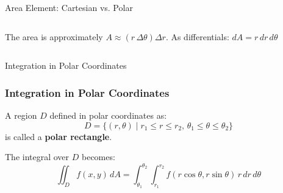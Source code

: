 \documentclass[aspectratio=169, UTF8]{beamer}
\begin{document}
\begin{frame}{Area Element: Cartesian vs. Polar}
\begin{columns}
\begin{column}{0.5\textwidth}
            The area is approximately $A \approx (r \, \Delta\theta) \Delta r$. As differentials:
            $ dA = r \, dr \, d\theta $
        \end{column}
    \end{columns}

\end{frame}

\begin{frame}{Integration in Polar Coordinates}
    \frametitle{Integration in Polar Coordinates}

    A region $D$ defined in polar coordinates as:
    $$ D = \{ (r, \theta) \mid r_1 \le r \le r_2, \, \theta_1 \le \theta \le \theta_2 \} $$
    is called a \textbf{polar rectangle}.

    \begin{center}
    \end{center}

    The integral over $D$ becomes:
    $$ \iint_D f(x, y) \, dA = \int_{\theta_1}^{\theta_2} \int_{r_1}^{r_2} f(r\cos\theta, r\sin\theta) \, r \, dr \, d\theta $$
\end{frame}
\end{document}
